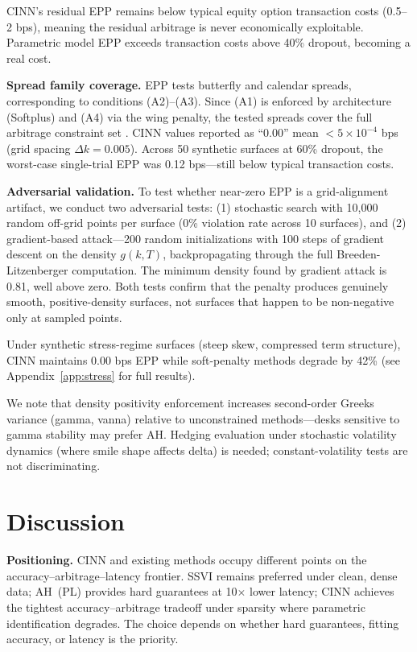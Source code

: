 \documentclass[11pt,a4paper]{article}
\begin{document}
CINN's residual EPP remains below typical equity option transaction costs (0.5--2 bps), meaning the residual arbitrage is never economically exploitable. Parametric model EPP exceeds transaction costs above 40\% dropout, becoming a real cost.

\textbf{Spread family coverage.} EPP tests butterfly and calendar spreads, corresponding to conditions (A2)--(A3). Since (A1) is enforced by architecture (Softplus) and (A4) via the wing penalty, the tested spreads cover the full arbitrage constraint set \citep{cousot2007, davis2007}. CINN values reported as ``0.00'' mean $< 5 \times 10^{-4}$ bps (grid spacing $\Delta k = 0.005$). Across 50 synthetic surfaces at 60\% dropout, the worst-case single-trial EPP was 0.12 bps---still below typical transaction costs.

\textbf{Adversarial validation.} To test whether near-zero EPP is a grid-alignment artifact, we conduct two adversarial tests: (1) stochastic search with 10,000 random off-grid points per surface (0\% violation rate across 10 surfaces), and (2) gradient-based attack---200 random initializations with 100 steps of gradient descent on the density $g(k, T)$, backpropagating through the full Breeden-Litzenberger computation. The minimum density found by gradient attack is 0.81, well above zero. Both tests confirm that the penalty produces genuinely smooth, positive-density surfaces, not surfaces that happen to be non-negative only at sampled points.

Under synthetic stress-regime surfaces (steep skew, compressed term structure), CINN maintains 0.00 bps EPP while soft-penalty methods degrade by 42\% (see Appendix~\ref{app:stress} for full results).

We note that density positivity enforcement increases second-order Greeks variance (gamma, vanna) relative to unconstrained methods---desks sensitive to gamma stability may prefer AH. Hedging evaluation under stochastic volatility dynamics (where smile shape affects delta) is needed; constant-volatility tests are not discriminating.

\section{Discussion}
\label{sec:discussion}

\textbf{Positioning.} CINN and existing methods occupy different points on the accuracy--arbitrage--latency frontier. SSVI \citep{gatheral2014} remains preferred under clean, dense data; AH~(PL) \citep{andreasen2011} provides hard guarantees at 10$\times$ lower latency; CINN achieves the tightest accuracy--arbitrage tradeoff under sparsity where parametric identification degrades. The choice depends on whether hard guarantees, fitting accuracy, or latency is the priority.
\end{document}
